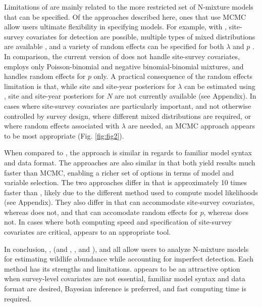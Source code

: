 \documentclass[codesnippet]{jss}
\begin{document}
Limitations of  are mainly related to the more restricted set of N-mixture models that can be specified. Of the approaches described here, ones that use MCMC allow users ultimate flexibility in specifying models. For example, with , site-survey covariates for detection are possible, multiple types of mixed distributions are available \citep{Joseph_Elkin_Martin_Possingham_2009,Martin_Royle_Mackenzie_Edwards_Kery_Gardner_2011}, and a variety of random effects can be specified for both $\lambda$ and $p$ \citep{Kery_Schaub_2011}. In comparison, the current version of  does not handle site-survey covariates, employs only Poisson-binomial and negative binomial-binomial mixtures, and handles random effects for $p$ only. A practical consequence of the random effects limitation is that, while site and site-year posteriors for $\lambda$ can be estimated using , site and site-year posteriors for $N$ are not currently available (see Appendix). In cases where site-survey covariates are particularly important, and not otherwise controlled by survey design, where different mixed distributions are required, or where random effects associated with $\lambda$ are needed, an MCMC approach appears to be most appropriate (Fig. \ref{fig:fig2}).

When compared to , the  approach is similar in regards to familiar model syntax and data format. The approaches are also similar in that both yield results much faster than MCMC, enabling a richer set of options in terms of model and variable selection. The two approaches differ in that  is approximately 10 times faster than , likely due to the different method used to compute model likelihoods (see Appendix). They also differ in that  can accommodate site-survey covariates, whereas  does not, and that  can accomodate random effects for $p$, whereas  does not. In cases where both computing speed and specification of site-survey covariates are critical,  appears to an appropriate tool.

In conclusion, ,  (and , , and ), and  all allow users to analyze N-mixture models for estimating wildlife abundance while accounting for imperfect detection. Each method has its strengths and limitations.  appears to be an attractive option when survey-level covariates are not essential, familiar model syntax and data format are desired, Bayesian inference is preferred, and fast computing time is required.
\end{document}
